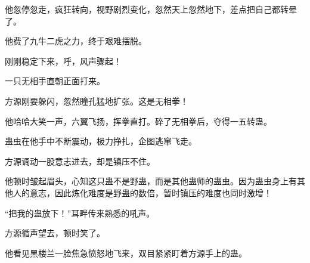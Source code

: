 \begin{this_body}
他忽停忽走，疯狂转向，视野剧烈变化，忽然天上忽然地下，差点把自己都转晕了。

他费了九牛二虎之力，终于艰难摆脱。

刚刚稳定下来，呼，风声骤起！

一只无相手直朝正面打来。

方源刚要躲闪，忽然瞳孔猛地扩张。这是无相拳！

他哈哈大笑一声，六翼飞扬，挥拳直打。碎了无相拳后，夺得一五转蛊。

蛊虫在他手中不断震动，极力挣扎，企图逃窜飞走。

方源调动一股意志进去，却是镇压不住。

他顿时皱起眉头，心知这只蛊不是野蛊，而是其他蛊师的蛊虫。因为蛊虫身上有其他人的意志，因此炼化难度是野蛊的数倍，暂时镇压的难度也同时激增！

“把我的蛊放下！”耳畔传来熟悉的吼声。

方源循声望去，顿时笑了。

他看见黑楼兰一脸焦急愤怒地飞来，双目紧紧盯着方源手上的蛊。

\end{this_body}

